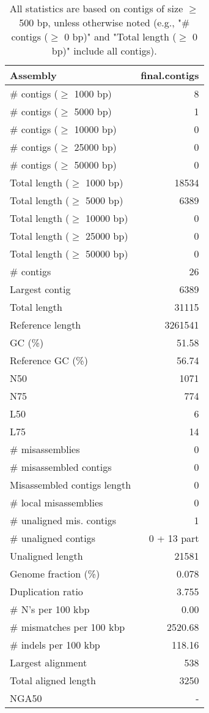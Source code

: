 \documentclass[12pt,a4paper]{article}
\begin{document}
\begin{table}[ht]
\begin{center}
\caption{All statistics are based on contigs of size $\geq$ 500 bp, unless otherwise noted (e.g., "\# contigs ($\geq$ 0 bp)" and "Total length ($\geq$ 0 bp)" include all contigs).}
\begin{tabular}{|l*{1}{|r}|}
\hline
Assembly & final.contigs \\ \hline
\# contigs ($\geq$ 1000 bp) & 8 \\ \hline
\# contigs ($\geq$ 5000 bp) & 1 \\ \hline
\# contigs ($\geq$ 10000 bp) & 0 \\ \hline
\# contigs ($\geq$ 25000 bp) & 0 \\ \hline
\# contigs ($\geq$ 50000 bp) & 0 \\ \hline
Total length ($\geq$ 1000 bp) & 18534 \\ \hline
Total length ($\geq$ 5000 bp) & 6389 \\ \hline
Total length ($\geq$ 10000 bp) & 0 \\ \hline
Total length ($\geq$ 25000 bp) & 0 \\ \hline
Total length ($\geq$ 50000 bp) & 0 \\ \hline
\# contigs & 26 \\ \hline
Largest contig & 6389 \\ \hline
Total length & 31115 \\ \hline
Reference length & 3261541 \\ \hline
GC (\%) & 51.58 \\ \hline
Reference GC (\%) & 56.74 \\ \hline
N50 & 1071 \\ \hline
N75 & 774 \\ \hline
L50 & 6 \\ \hline
L75 & 14 \\ \hline
\# misassemblies & 0 \\ \hline
\# misassembled contigs & 0 \\ \hline
Misassembled contigs length & 0 \\ \hline
\# local misassemblies & 0 \\ \hline
\# unaligned mis. contigs & 1 \\ \hline
\# unaligned contigs & 0 + 13 part \\ \hline
Unaligned length & 21581 \\ \hline
Genome fraction (\%) & 0.078 \\ \hline
Duplication ratio & 3.755 \\ \hline
\# N's per 100 kbp & 0.00 \\ \hline
\# mismatches per 100 kbp & 2520.68 \\ \hline
\# indels per 100 kbp & 118.16 \\ \hline
Largest alignment & 538 \\ \hline
Total aligned length & 3250 \\ \hline
NGA50 & - \\ \hline
\end{tabular}
\end{center}
\end{table}
\end{document}

